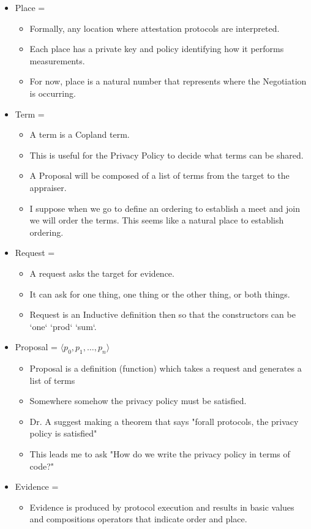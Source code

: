 \documentclass[10pt]{report}
\newcommand{\squash}{\itemsep=0pt\parskip=0pt}
\newcommand{\terms}[0]{\cnc{\emph{t}} }
\newcommand{\req}[0]{\cnc{\emph{R}}}
\newcommand{\vals}[0]{\cnc{\emph{e}}}
\newcommand{\proposal}[0]{$\langle p_0,p_1,\ldots,p_n\rangle$}
\begin{document}
\begin{itemize}
\item Place = \pl
	\begin{itemize}
	\squash
	\item Formally, any location where attestation protocols are interpreted. 
	\item Each place has a private key and policy
		  identifying how it performs measurements. 
	\item For now, place is a natural number that represents where the
          Negotiation is occurring.  
	\end{itemize}
\item Term = \terms
	\begin{itemize}
	\squash
	\item A term is a Copland term. 
	\item This is useful for the Privacy Policy to decide what terms can
          be shared. 
	\item A Proposal will be composed of a list of terms from the target
          to the appraiser.
	\item I suppose when we go to define an ordering to establish a meet
          and join we will order the terms. This seems like a natural place
          to establish ordering. 
	\end{itemize}
\item Request = \req
	\begin{itemize}
	\squash
	\item A request asks the target for evidence. 
	\item It can ask for one thing, one thing or the other thing, or
          both things. 
	\item Request is an Inductive definition then so that the constructors
          can be `one` `prod` `sum`.
	\end{itemize}
\item Proposal = \proposal
	\begin{itemize}
	\squash
	\item Proposal is a definition (function) which takes a request
          and generates a list of terms
	\item Somewhere somehow the privacy policy must be satisfied. 
	\item Dr. A suggest making a theorem that says "forall protocols,
          the privacy policy is satisfied"
	\item This leads me to ask "How do we write the privacy policy in
          terms of code?"
	\end{itemize}
\item Evidence = \vals
	\squash
	\begin{itemize}
	\item Evidence is produced by protocol execution and results in 
          basic values and compositions operators that indicate order 
	      and place.
	\end{itemize} 
\end{itemize}
\end{document}
